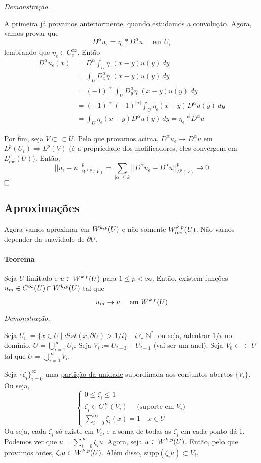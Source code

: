 \documentclass[11pt]{article}
\newcommand{\qed}{$\hfill\square$}
\newcommand{\N}{\mathbb{N}}
\newcommand{\pu}{\partial U}
\newcommand{\e}{\epsilon}
\begin{document}
\textit{Demonstração.}

A primeira já provamos anteriormente, quando estudamos a convolução. Agora, vamos provar que \[ D^\alpha u_\e = \eta_\e * D^\alpha u \quad \text{ em } U_\e\] lembrando que \( \eta_\e \in C^\infty_c \). Então \begin{align*}
	D^\alpha u_\e(x) &= D^\alpha \int_U \eta_\e(x-y) u(y)\ dy\\
	&=  \int_U D^\alpha_x \eta_\e(x-y) u(y)\ dy\\
	&=  (-1)^{|\alpha|} \int_U D^\alpha_y \eta_\e(x-y) u(y)\ dy\\
	&= (-1)^{|\alpha|}(-1)^{|\alpha|}  \int_U \eta_\e(x-y) D^\alpha u(y)\ dy\\
	&=  \int_U \eta_\e(x-y) D^\alpha u(y)\ dy = \eta_\e * D^\alpha u
\end{align*}

Por fim, seja \( V \subset\subset U \). Pelo que provamos acima, \( D^\alpha u_\e \rightarrow D^\alpha u \) em \( L^p(U_\e) \Rightarrow L^p(V) \) (é a propriedade dos molificadores, eles convergem em \( L^p_{loc}(U) \)). Então, \[ ||u_\e - u||^p_{W^{k,p}(V)} = \sum_{|\alpha|\leq k} ||D^\alpha u_\e - D^\alpha u||^p_{L^p(V)} \rightarrow 0\] \qed

\subsection{Aproximações}

Agora vamos aproximar em \( W^{k,p}(U) \) e não somente \( W^{k,p}_{loc}(U)\). Não vamos depender da suavidade de \( \pu \).

\paragraph{Teorema} Seja \( U \) limitado e \( u \in W^{k,p}(U) \) para \( 1\leq p < \infty \). Então, existem funções \( u_m \in C^{\infty}(U) \cap W^{k,p}(U) \) tal que \[ u_m \rightarrow u \quad \text{ em }W^{k,p}(U) \]

\textit{Demonstração.}

Seja \( U_i := \{ x \in U \mid dist(x, \pu) > 1/i\} \quad i \in \N^*\), ou seja, adentrar \( 1/i \) no domínio. \( U = \bigcup_{i=1}^\infty U_i \). Seja \( V_i := U_{i+3} - \overline{U}_{i+1} \) (vai ser um anel). Seja \( V_0 \subset\subset U \) tal que \( U=\bigcup_{i=0}^{\infty}V_i \).

Seja \( \{\zeta_i\}_{i=0}^{\infty} \) uma \href{https://en.wikipedia.org/wiki/Partition_of_unity}{partição da unidade} subordinada aos conjuntos abertos \( \{V_i\} \). Ou seja, \[ \begin{cases}
	0 \leq \zeta_i \leq 1 \\
	\zeta_i \in C^\infty_c(V_i)\quad  \text{ (suporte em } V_i \text{)}\\
	\sum_{i=0}^{\infty} \zeta_i(x) = 1 \quad x \in U
\end{cases} \] Ou seja, cada \( \zeta_i \) só existe em \( V_i \), e a soma de todas as \( \zeta_i \) em cada ponto dá 1. Podemos ver que \( u=\sum_{i=0}^{\infty}\zeta_iu \). Agora, seja \( u \in W^{k,p}(U) \). Então, pelo que provamos antes, \( \zeta_iu \in W^{k,p}(U) \). Além disso, \( \text{supp}(\zeta_i u) \subset V_i \).
\end{document}
